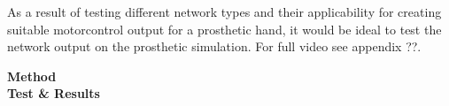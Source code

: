 \documentclass[../main.tex]{subfiles}
\begin{document}
As a result of testing different network types and their applicability for creating suitable motorcontrol output for a prosthetic hand, it would be ideal to test the network output on the prosthetic simulation.
For full video see appendix ??.

\textbf{Method}\\

\textbf{Test \& Results}\\





\end{document}
